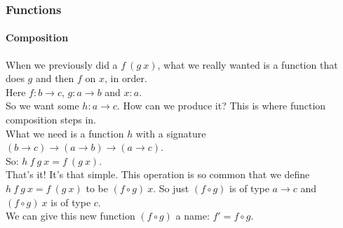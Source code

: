 \documentclass{beamer}
\begin{document}
\begin{frame}
  \frametitle{Functions}
  \framesubtitle{Composition}
  When we previously did a $f\:(g\:x)$, what we really wanted is a
  function that does $g$ and then $f$ on $x$, in order.\\
  Here $f:b \rightarrow c$, $g:a \rightarrow b$ and $x:a$.\\
  \pause
  So we want some $h:a \rightarrow c$. How can we produce it? This is
  where function composition steps in.\\
  \pause
  What we need is a function $h$ with a signature $(b \rightarrow c)
  \rightarrow (a \rightarrow b) \rightarrow (a \rightarrow c)$.\\
  So: $h\:f\:g\:x = f\:(g\:x)$.\\
  \pause
  That's it! It's that simple. This operation is so common that we
  define $h\:f\:g\:x = f\:(g\:x)$ to be $(f \circ g)\:x$. So just $(f
  \circ g)$ is of type $a \rightarrow c$ and $(f \circ g)\:x$ is of
  type $c$.\\
  \pause
  We can give this new function $(f \circ g)$ a name: $f' = f \circ g$.
\end{frame}
\end{document}

